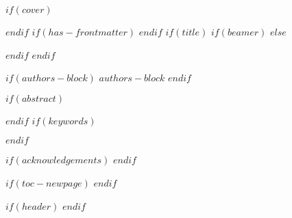 $if(cover)$

$endif$
$if(has-frontmatter)$
\frontmatter
$endif$
$if(title)$
$if(beamer)$
\frame{\titlepage}
$else$
\maketitle
$endif$
$endif$

$if(authors-block)$
$authors-block$
$endif$

$if(abstract)$
\begin{abstract}
$abstract$
\end{abstract}
$endif$
$if(keywords)$
\begin{center}
\end{center}
$endif$

$if(acknowledgements)$
$endif$

$if(toc-newpage)$
\newpage
$endif$

$if(header)$
$endif$